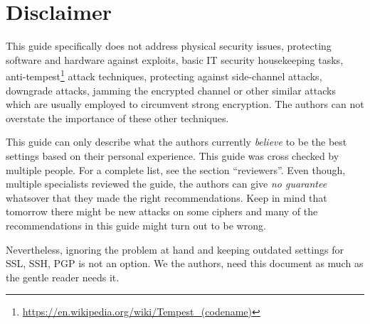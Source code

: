 \section{Disclaimer}
\label{section:disclaimer}
This guide specifically does not address physical security issues, protecting software and hardware against exploits, basic IT security housekeeping tasks, anti-tempest\footnote{\url{https://en.wikipedia.org/wiki/Tempest\_(codename)}} attack techniques, protecting against side-channel attacks, downgrade attacks, jamming the encrypted channel or other similar attacks which are usually employed to circumvent strong encryption. The authors can not overstate the importance of these other techniques. 

This guide can only describe what the authors currently \emph{believe} to be the best settings based on their personal experience. This guide was cross checked by multiple people. For a complete list, see the section ``reviewers''. Even though, multiple specialists reviewed the guide, the authors can give \emph{no guarantee} whatsover that they made the right recommendations. Keep in mind that tomorrow there might be new attacks on some ciphers and many of the recommendations in this guide might turn out to be wrong.



Nevertheless, ignoring the problem at hand and keeping outdated settings for SSL, SSH, PGP is not an option. We the authors, need this document as much as the gentle reader needs it.

